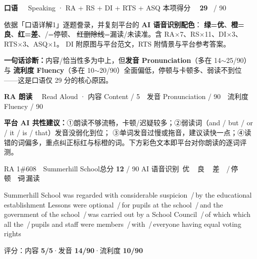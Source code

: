 \documentclass[11pt]{article}
\newcommand{\sfull}[1]{\textcolor{cFix}{\bfseries #1}}     %
\newcommand{\spart}[1]{\textcolor{cPartial}{\bfseries #1}} %
\newcommand{\szero}[1]{\textcolor{cWrong}{\bfseries #1}}   %
\newcommand{\ptesection}[3]{%
  \needspace{6\baselineskip}
  \begin{tcolorbox}[enhanced, colback=cAccent, colframe=cAccent, sharp corners,
     left=14pt, right=14pt, top=10pt, bottom=10pt, boxrule=0pt]
    {\fontsize{20}{24}\selectfont\bfseries\color{white} #1\ \ }%
    {\large\color{white!85} #2}\hfill
    {\large\color{white}本项得分\ \ }{\fontsize{22}{24}\selectfont\bfseries\color{white} #3}%
    \ {\color{white!85}/ 90}
  \end{tcolorbox}}
\newcommand{\ptetask}[2]{%
  \needspace{4\baselineskip}\medskip
  \begin{tcolorbox}[enhanced, colback=cHead, colframe=cHead, sharp corners,
     left=12pt, right=12pt, top=5pt, bottom=5pt, boxrule=0pt]
    {\large\bfseries\color{white} #1}\ \ {\color{white!80} #2}
  \end{tcolorbox}\smallskip}
\newcommand{\sg}[1]{\textcolor{cSpkGood}{#1}}   %
\newcommand{\sy}[1]{\textcolor{cSpkOk}{#1}}     %
\newcommand{\pse}{{\color{gray}\,/\,}}          %
\newcommand{\asrlegend}{{\footnotesize\color{gray}AI 语音识别\quad
  {\color{cSpkGood}\textbullet}\,优\ \ {\color{cSpkOk}\textbullet}\,良\ \
  {\color{cSpkBad}\textbullet}\,差\ \ {\color{gray}/}\,停顿\ \
  {\color{cSpkBad}\sout{词}}\,漏读}}
\begin{document}
\ptesection{口语}{Speaking · RA + RS + DI + RTS + ASQ}{29}

\vspace{1mm}
{\small\color{gray} 依据「口语详解1」逐题誊录，并复刻平台的 \textbf{AI 语音识别配色}：
{\color{cSpkGood}\textbf{绿=优}}、{\color{cSpkOk}\textbf{橙=良}}、{\color{cSpkBad}\textbf{红=差}}、{\color{gray}/=停顿}、
{\color{cSpkBad}\sout{红删除线}}=漏读/未读准。含 RA$\times$7、RS$\times$11、DI$\times$3、RTS$\times$3、ASQ$\times$1。
DI 附原图与平台范文，RTS 附情景与平台参考答案。}
\vspace{1mm}

\begin{notebox}
{\footnotesize \textbf{一句话诊断：}内容/恰当性多为中上，但\textbf{发音 Pronunciation}（多在 14$\sim$25/90）与
\textbf{流利度 Fluency}（多在 10$\sim$20/90）全面偏低，停顿与卡顿多、弱读不到位——这是口语仅 29 分的核心原因。}
\end{notebox}

\ptetask{RA 朗读}{Read Aloud · 内容 Content / 5　发音 Pronunciation / 90　流利度 Fluency / 90}

\begin{notebox}
{\footnotesize\textbf{平台 AI 共性建议：}①朗读不够流畅，卡顿/迟疑较多；②弱读词（and / but / or / it / is / that）发音没弱化到位；
③单词发音过慢或拖音，建议读快一点；④读错的词偏多，重点纠正{\color{cSpkBad}标红}与{\color{cSpkOk}标橙}的词。下方彩色文本即平台对你朗读的逐词评测。}
\end{notebox}

\begin{qblock}{RA 1\quad \#608\ \ Summerhill School}{总分 \textcolor{cAccent}{\bfseries 12} / 90}
\asrlegend
\begin{asrbox}
\sg{Summerhill School} \sg{was regarded with considerable suspicion} \pse \sg{by the educational establishment} \sy{Lessons} \sy{were optional} \pse \sy{for} \sg{pupils at the school} \pse \sg{and the government} \sg{of the school} \pse \sg{was carried out by a School Council} \pse \sy{of which which all the} \pse \sy{pupils} \sg{and staff were members} \pse \sg{with} \pse \sg{everyone having equal voting rights}
\end{asrbox}
{\small 评分：内容 \sfull{5/5}\quad·\quad 发音 \spart{14/90}\quad·\quad 流利度 \szero{10/90}}
\end{qblock}
\end{document}
